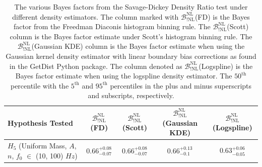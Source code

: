 \begin{table}[ht]
\begin{tabularx}{1.0\textwidth}{l c c c c}
\hline\hline
 Hypothesis Tested  & $\mathcal{B}^{\mathrm{NL}}_{\mathrm{!NL}}$(FD)  & $\mathcal{B}^{\mathrm{NL}}_{\mathrm{!NL}}$(Scott) & $\mathcal{B}^{\mathrm{NL}}_{\mathrm{!NL}}$(Gaussian KDE) & $\mathcal{B}^{\mathrm{NL}}_{\mathrm{!NL}}$(Logspline)\\
\hline\hline
$H_5$ (Uniform Mass, $A$, $n$, $f_0$ $\in$ (10, 100) $Hz$) &
$0.66^{+0.08}_{-0.07}$ & $0.66^{+0.08}_{-0.07}$ & $0.66^{+0.13}_{-0.1}$ & $0.63^{+0.06}_{-0.05}$ \\
\hline\hline
\end{tabularx}
\caption{The various Bayes factors from the Savage-Dickey Density Ratio test under different density estimators. The column marked with $\mathcal{B}^{\mathrm{NL}}_{\mathrm{!NL}}$(FD) is the Bayes factor from the Freedman Diaconis histogram binning rule. The $\mathcal{B}^{\mathrm{NL}}_{\mathrm{!NL}}$(Scott) column is the Bayes factor estimate under Scott's histogram binning rule. The $\mathcal{B}^{\mathrm{NL}}_{\mathrm{!NL}}$(Gaussian KDE) column is the Bayes factor estimate when using the Gaussian kernel density estimator with linear boundary bias corrections as found in the GetDist Python package. The column denoted as  $\mathcal{B}^{\mathrm{NL}}_{\mathrm{!NL}}$(Logspline) is the Bayes factor estimate when using the logspline density estimator. The $50^{\mathrm{th}}$ percentile with the $5^{\mathrm{th}}$ and $95^{\mathrm{th}}$ percentiles in the plus and minus superscripts and subscripts, respectively.}\label{table:Bayes_sddr}
\end{table}

